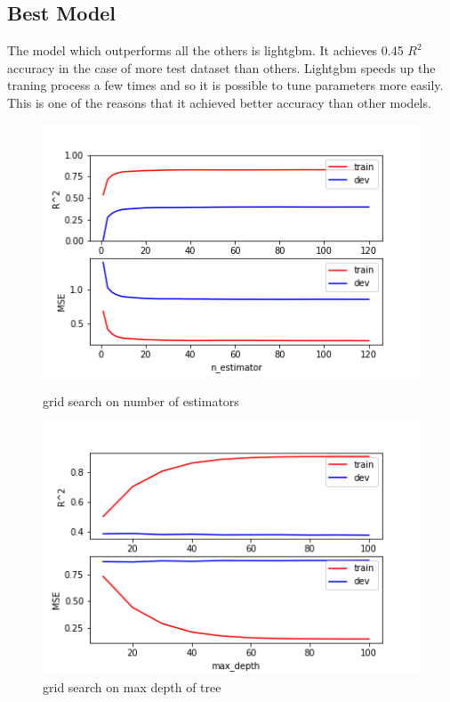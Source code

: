 \documentclass{article}
\begin{document}
\subsection{Best Model}

The model which outperforms all the others is lightgbm. It achieves 0.45 $R^2$ accuracy in the case of more test dataset than others.  Lightgbm speeds up the traning process a few times and so it is possible to tune parameters more easily. This is one of the reasons that it achieved better accuracy than other models. 

\begin{figure}
	\centering
	\begin{minipage}[b]{0.4\textwidth}
	\includegraphics[width=1.2\linewidth, height=0.4\textheight, keepaspectratio]{../plots/RandomForest_nestimator.png}
	\caption{grid search on number of estimators}
	\end{minipage}
	\hfill
	\begin{minipage}[b]{0.4\textwidth}
	\includegraphics[width=1.2\linewidth, height=0.4\textheight, keepaspectratio]{../plots/RandomForest_maxdepth_tree1.png}
	\caption{grid search on max depth of tree}
	\end{minipage}
	
	\label{fig:feature_imp}
\end{figure}
\end{document}
